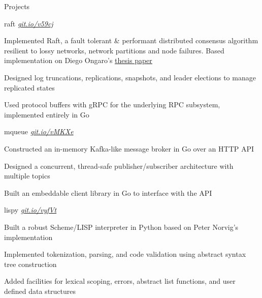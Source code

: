\documentclass{resume} %
\begin{document}
\begin{rSection}{Projects}
  
  \begin{rSubsection}{raft}
	  {\em {\href{http://github.com/ridwanmsharif/raft}
		    {git.io/v59cj}}}
	  {}

    \item Implemented Raft, a fault tolerant \& performant distributed
      consensus algorithm resilient to lossy networks, network partitions and node failures.
      Based implementation on Diego Ongaro's
      \href{https://raft.github.io/raft.pdf}{\underline{thesis paper}}
    \item Designed log truncations, replications, snapshots, and leader
      elections to manage replicated states
    \item Used protocol buffers with gRPC for the underlying RPC subsystem,
      implemented entirely in Go
      
  \end{rSubsection}

  \begin{rSubsection}{mqueue}
	  {\em {\href{http://github.com/ridwanmsharif/mqueue}
		    {git.io/vMKXe}}}
	  {}

    \item Constructed an in-memory Kafka-like message broker in Go over an HTTP API
    \item Designed a concurrent, thread-safe publisher/subscriber architecture
      with multiple topics
    \item Built an embeddable client library in Go to interface with the API
        
  \end{rSubsection}

  \begin{rSubsection}{lispy}
	  {\em {\href{http://github.com/ridwanmsharif/lispy}
		    {git.io/vyfVt}}}
	  {}

    \item Built a robust Scheme/LISP interpreter in Python based on Peter
      Norvig's implementation
    \item Implemented tokenization, parsing, and code validation using abstract
      syntax tree construction
    \item Added facilities for lexical scoping, errors, abstract list
      functions, and user defined data structures
  \end{rSubsection}


\end{rSection}
\end{document}
